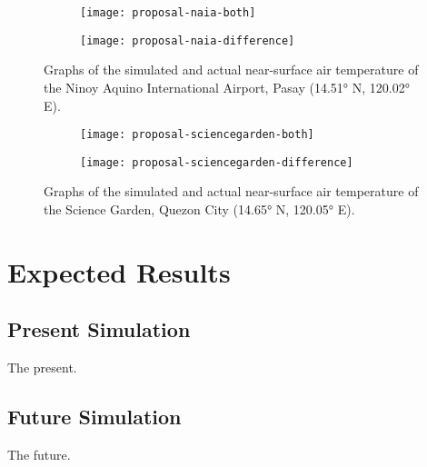 	\begin{figure}
		\centering
		\begin{subfigure}{\textwidth}
			\texttt{[image: proposal-naia-both]}
		\end{subfigure}
		\begin{subfigure}{\textwidth}
			\texttt{[image: proposal-naia-difference]}
		\end{subfigure}
		\caption{
			Graphs of the simulated and actual near-surface air temperature of the Ninoy Aquino International Airport, Pasay (\ang{14.51} N, \ang{120.02} E).
		}
		\label{fig:proposal-naia-results}
	\end{figure}

	\begin{figure}
		\centering
		\begin{subfigure}{\textwidth}
			\texttt{[image: proposal-sciencegarden-both]}
		\end{subfigure}
		\begin{subfigure}{\textwidth}
			\texttt{[image: proposal-sciencegarden-difference]}
		\end{subfigure}
		\caption{
			Graphs of the simulated and actual near-surface air temperature of the Science Garden, Quezon City (\ang{14.65} N, \ang{120.05} E).
		}
		\label{fig:proposal-sciencegarden-results}
	\end{figure}

\section{Expected Results}
	\subsection{Present Simulation}
		The present.
		
	\subsection{Future Simulation}
		The future.